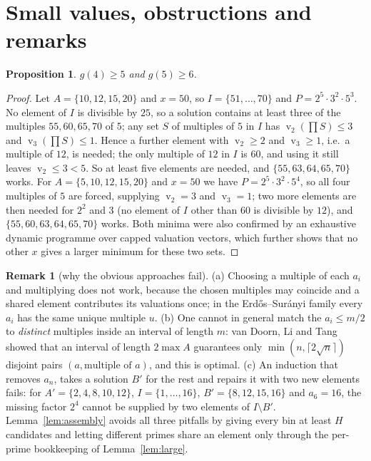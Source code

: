 \documentclass[11pt]{article}
\newtheorem{proposition}[theorem]{Proposition}
\theoremstyle{definition}
\newtheorem{remark}[theorem]{Remark}
\DeclareMathOperator{\vp}{v}
\begin{document}
\section{Small values, obstructions and remarks}\label{sec:remarks}

\begin{proposition}\label{prop:small}
$g(4)\ge 5$ and $g(5)\ge 6$.
\end{proposition}
\begin{proof}
Let $A=\{10,12,15,20\}$ and $x=50$, so $I=\{51,\dots,70\}$ and $P=2^5\cdot3^2\cdot5^3$. No element of $I$ is
divisible by $25$, so a solution contains at least three of the multiples $55,60,65,70$ of $5$; any set $S$ of
multiples of $5$ in $I$ has $\vp_2(\prod S)\le 3$ and $\vp_3(\prod S)\le 1$. Hence a further element with
$\vp_2\ge 2$ and $\vp_3\ge 1$, i.e.\ a multiple of $12$, is needed; the only multiple of $12$ in $I$ is $60$,
and using it still leaves $\vp_2\le 3<5$. So at least five elements are needed, and $\{55,63,64,65,70\}$
works. For $A=\{5,10,12,15,20\}$ and $x=50$ we have $P=2^5\cdot3^2\cdot5^4$, so all four multiples of $5$ are
forced, supplying $\vp_2=3$ and $\vp_3=1$; two more elements are then needed for $2^2$ and $3$ (no element of
$I$ other than $60$ is divisible by $12$), and $\{55,60,63,64,65,70\}$ works. Both minima were also confirmed
by an exhaustive dynamic programme over capped valuation vectors, which further shows that no other $x$
gives a larger minimum for these two sets.
\end{proof}

\begin{remark}[why the obvious approaches fail]
(a) Choosing a multiple of each $a_i$ and multiplying does not work, because the chosen multiples may
coincide and a shared element contributes its valuations once; in the Erd\H{o}s--Sur\'anyi family every
$a_i$ has the same unique multiple $u$. (b) One cannot in general match the $a_i\le m/2$ to
\emph{distinct} multiples inside an interval of length $m$: van Doorn, Li and Tang \cite{vDLT26} showed that an
interval of length $2\max A$ guarantees only $\min(n,\lceil 2\sqrt n\rceil)$ disjoint pairs $(a,\text{multiple of }a)$,
and this is optimal. (c) An induction that removes $a_n$, takes a solution $B'$ for the rest and repairs it
with two new elements fails: for $A'=\{2,4,8,10,12\}$, $I=\{1,\dots,16\}$, $B'=\{8,12,15,16\}$ and $a_6=16$,
the missing factor $2^4$ cannot be supplied by two elements of $I\setminus B'$. Lemma~\ref{lem:assembly}
avoids all three pitfalls by giving every bin at least $H$ candidates and letting different primes share an
element only through the per-prime bookkeeping of Lemma~\ref{lem:large}.
\end{remark}
\end{document}
